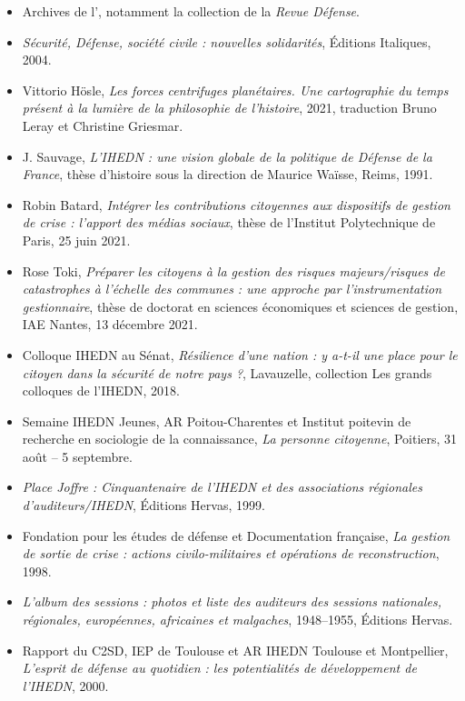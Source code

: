 \begin{itemize}[leftmargin=*]
    \item Archives de l'\UnionIHEDN, notamment la collection de la \textit{Revue Défense}.
    \item \textit{Sécurité, Défense, société civile : nouvelles solidarités}, Éditions Italiques, 2004.
    \item Vittorio Hösle, \textit{Les forces centrifuges planétaires. Une cartographie du temps présent à la lumière de la philosophie de l'histoire}, 2021, traduction Bruno Leray et Christine Griesmar.
    \item J. Sauvage, \textit{L'IHEDN : une vision globale de la politique de Défense de la France}, thèse d'histoire sous la direction de Maurice Waïsse, Reims, 1991.
    \item Robin Batard, \textit{Intégrer les contributions citoyennes aux dispositifs de gestion de crise : l'apport des médias sociaux}, thèse de l'Institut Polytechnique de Paris, 25 juin 2021.
    \item Rose Toki, \textit{Préparer les citoyens à la gestion des risques majeurs/risques de catastrophes à l'échelle des communes : une approche par l'instrumentation gestionnaire}, thèse de doctorat en sciences économiques et sciences de gestion, IAE Nantes, 13 décembre 2021.
    \item Colloque IHEDN au Sénat, \textit{Résilience d'une nation : y a-t-il une place pour le citoyen dans la sécurité de notre pays ?}, Lavauzelle, collection Les grands colloques de l'IHEDN, 2018.
    \item Semaine IHEDN Jeunes, AR Poitou-Charentes et Institut poitevin de recherche en sociologie de la connaissance, \textit{La personne citoyenne}, Poitiers, 31 août -- 5 septembre.
    \item \textit{Place Joffre : Cinquantenaire de l'IHEDN et des associations régionales d'auditeurs/IHEDN}, Éditions Hervas, 1999.
    \item Fondation pour les études de défense et Documentation française, \textit{La gestion de sortie de crise : actions civilo-militaires et opérations de reconstruction}, 1998.
    \item \textit{L'album des sessions : photos et liste des auditeurs des sessions nationales, régionales, européennes, africaines et malgaches}, 1948--1955, Éditions Hervas.
    \item Rapport du C2SD, IEP de Toulouse et AR IHEDN Toulouse et Montpellier, \textit{L'esprit de défense au quotidien : les potentialités de développement de l'IHEDN}, 2000.

\end{itemize}

